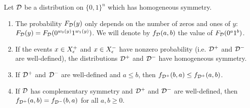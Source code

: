 \begin{lemma}
\label{lem:symproperties}
Let $\mathcal{D}$ be a distribution on $\{0, 1\}^n$ which has homogeneous symmetry.

\begin{enumerate}
    \item The probability $F_{\mathcal{D}}(y)$ only depends on the number of zeros and ones
    of $y$: $F_{\mathcal{D}}(y) = F_{\mathcal{D}}(0^{w_0(y)}1^{w_1(y)})$. We will denote by $f_{\mathcal{D}}(a, b)$ the value of $F_{\mathcal{D}}(0^a 1^b)$.
    \item If the events $x \in X^+_\epsilon$ and $x \in X^-_\epsilon$ have nonzero probability
    (i.e. $\mathcal{D}^+$ and $\mathcal{D}^-$ are well-defined),
    the distributions $\mathcal{D}^+$ and $\mathcal{D}^-$ have homogeneous symmetry. 
    \item If $\mathcal{D}^+$ and $\mathcal{D}^-$ are well-defined and $a \leq b$, then $f_{\mathcal{D}^+}(b, a) \leq f_{\mathcal{D}^+}(a, b)$.
    \item If $\mathcal{D}$ has complementary symmetry and $\mathcal{D}^+$ and $\mathcal{D}^-$ are well-defined, then  
    $f_{\mathcal{D}^+}(a, b) = f_{\mathcal{D}^-}(b, a)$ for all
    $a, b \geq 0$.
\end{enumerate}
\end{lemma}
